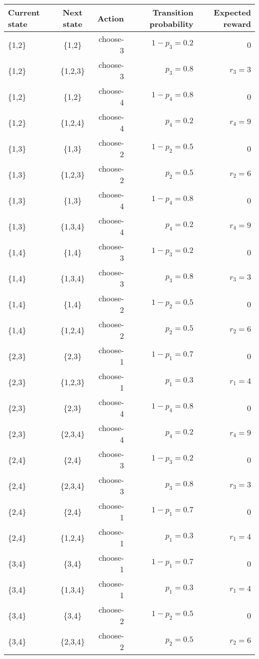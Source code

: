 \documentclass[english]{scrartcl}
\begin{document}
  \begin{tabular}{ l | c | r | r | r }
  \hline                       
  Current state & Next state & Action & Transition probability & Expected reward \\ \hline 
  \{1,2\} & \{1,2\} & choose-3 & $1 - p_{3}=0.2$ & 0 \\
  \{1,2\} & \{1,2,3\} & choose-3 & $p_{3}=0.8$ & $r_{3}=3$ \\
  \{1,2\} & \{1,2\} & choose-4 & $1 - p_{4}=0.8$ & 0 \\
  \{1,2\} & \{1,2,4\} & choose-4 & $p_{4}=0.2$ & $r_{4}=9$ \\
  \{1,3\} & \{1,3\} & choose-2 & $1 - p_{2}=0.5$ & 0 \\
  \{1,3\} & \{1,2,3\} & choose-2 & $p_{2}=0.5$ & $r_{2}=6$ \\
  \{1,3\} & \{1,3\} & choose-4 & $1 - p_{4}=0.8$ & 0 \\
  \{1,3\} & \{1,3,4\} & choose-4 & $p_{4}=0.2$ & $r_{4}=9$ \\
   \{1,4\} & \{1,4\} & choose-3 & $1 - p_{3}=0.2$ & 0 \\
  \{1,4\} & \{1,3,4\} & choose-3 & $p_{3}=0.8$ & $r_{3}=3$ \\
  \{1,4\} & \{1,4\} & choose-2 & $1 - p_{2}=0.5$ & 0 \\
  \{1,4\} & \{1,2,4\} & choose-2 & $p_{2}=0.5$ & $r_{2}=6$   \\
  \{2,3\} & \{2,3\} & choose-1 & $1 - p_{1}=0.7$ & 0 \\
  \{2,3\} & \{1,2,3\} & choose-1 & $p_{1}=0.3$ & $r_{1}=4$ \\
  \{2,3\} & \{2,3\} & choose-4 & $1 - p_{4}=0.8$ & 0 \\
  \{2,3\} & \{2,3,4\} & choose-4 & $p_{4}=0.2$ & $r_{4}=9$ \\
  \{2,4\} & \{2,4\} & choose-3 & $1 - p_{3}=0.2$ & 0 \\
  \{2,4\} & \{2,3,4\} & choose-3 & $p_{3}=0.8$ & $r_{3}=3$ \\
  \{2,4\} & \{2,4\} & choose-1 & $1 - p_{1}=0.7$ & 0 \\
  \{2,4\} & \{1,2,4\} & choose-1 & $p_{1}=0.3$ & $r_{1}=4$ \\
  \{3,4\} & \{3,4\} & choose-1 & $1 - p_{1}=0.7$ & 0 \\
  \{3,4\} & \{1,3,4\} & choose-1 & $p_{1}=0.3$ & $r_{1}=4$ \\
  \{3,4\} & \{3,4\} & choose-2 & $1 - p_{2}=0.5$ & 0 \\
  \{3,4\} & \{2,3,4\} & choose-2 & $p_{2}=0.5$ & $r_{2}=6$ \\

\end{tabular}
\end{document}
